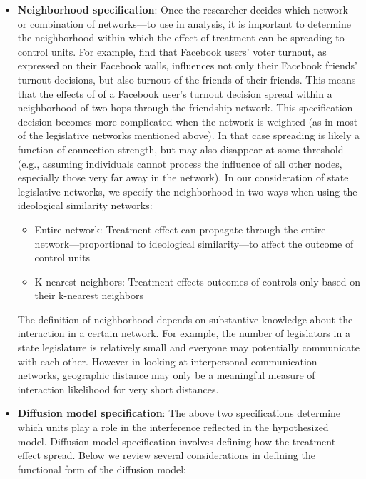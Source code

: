 \documentclass[12pt]{article}
\begin{document}
\begin{itemize}
\item \textbf{Neighborhood specification}:
Once the researcher decides which network---or combination of networks---to use in analysis, it is important to determine the neighborhood within which the effect of treatment can be spreading to control units. For example, \cite{Bond:2012} find that Facebook users' voter turnout, as expressed on their Facebook walls, influences not only their Facebook friends' turnout decisions, but also turnout of the friends of their friends. This means that the effects of of a Facebook user's turnout decision spread within a neighborhood of two hops through the friendship network. This specification decision becomes more complicated when the network is weighted (as in most of the legislative networks mentioned above). In that case spreading is likely a function of connection strength, but may also disappear at some threshold (e.g., assuming individuals cannot process the influence of all other nodes, especially those very far away in the network).  In our consideration of state legislative networks, we specify the neighborhood in two ways when using the ideological similarity networks:
\begin{itemize}
\item Entire network: Treatment effect can propagate through the entire network---proportional to ideological similarity---to affect the outcome of control units
\item K-nearest neighbors: Treatment effects outcomes of controls only based on their k-nearest neighbors
\end{itemize}

The definition of neighborhood depends on substantive knowledge about the interaction in a certain network. For example, the number of legislators in a state legislature is relatively small and everyone may potentially communicate with each other. However in looking at interpersonal communication networks, geographic distance may only be a meaningful measure of interaction likelihood for very short distances.


\item \textbf{Diffusion model specification}:
The above two specifications determine which units play a role in the interference reflected in the hypothesized model. Diffusion model specification involves defining how the treatment effect spread. Below we review several considerations in defining the functional form of the diffusion model:


\end{itemize}
\end{document}
